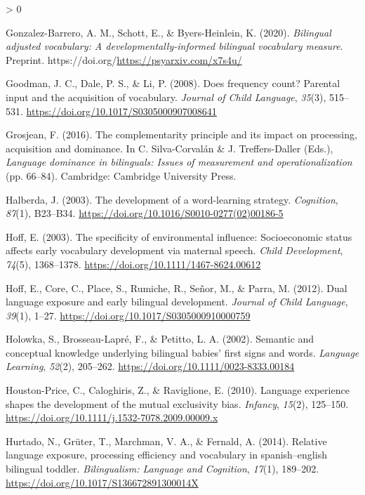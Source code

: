 \documentclass[
  english,
  ,man,floatsintext]{apa6}
\newlength{\cslhangindent}
\newenvironment{CSLReferences}[2] %
 {%
  \setlength{\parindent}{0pt}
  \ifodd #1 \everypar{\setlength{\hangindent}{\cslhangindent}}\ignorespaces\fi
  \ifnum #2 > 0
  \setlength{\parskip}{#2\baselineskip}
  \fi
 }%
 {}
\begin{document}
\begin{CSLReferences}{1}{0}
\leavevmode\hypertarget{ref-Gonzalez-Barrero_2020}{}%
Gonzalez-Barrero, A. M., Schott, E., \& Byers-Heinlein, K. (2020). \emph{Bilingual adjusted vocabulary: A developmentally-informed bilingual vocabulary measure}. Preprint. https://doi.org/\url{https://psyarxiv.com/x7s4u/}

\leavevmode\hypertarget{ref-Goodman_etal_2008}{}%
Goodman, J. C., Dale, P. S., \& Li, P. (2008). Does frequency count? Parental input and the acquisition of vocabulary. \emph{Journal of Child Language}, \emph{35}(3), 515--531. \url{https://doi.org/10.1017/S0305000907008641}

\leavevmode\hypertarget{ref-Grosjean_2016}{}%
Grosjean, F. (2016). The complementarity principle and its impact on processing, acquisition and dominance. In C. Silva-Corvalán \& J. Treffers-Daller (Eds.), \emph{Language dominance in bilinguals: Issues of measurement and operationalization} (pp. 66--84). Cambridge: Cambridge University Press.

\leavevmode\hypertarget{ref-Halberda_2003}{}%
Halberda, J. (2003). The development of a word-learning strategy. \emph{Cognition}, \emph{87}(1), B23--B34. \url{https://doi.org/10.1016/S0010-0277(02)00186-5}

\leavevmode\hypertarget{ref-Hoff_2003}{}%
Hoff, E. (2003). The specificity of environmental influence: Socioeconomic status affects early vocabulary development via maternal speech. \emph{Child Development}, \emph{74}(5), 1368--1378. \url{https://doi.org/10.1111/1467-8624.00612}

\leavevmode\hypertarget{ref-Hoff_etal_2012}{}%
Hoff, E., Core, C., Place, S., Rumiche, R., Señor, M., \& Parra, M. (2012). Dual language exposure and early bilingual development. \emph{Journal of Child Language}, \emph{39}(1), 1--27. \url{https://doi.org/10.1017/S0305000910000759}

\leavevmode\hypertarget{ref-Holowka_etal_2002}{}%
Holowka, S., Brosseau-Lapré, F., \& Petitto, L. A. (2002). Semantic and conceptual knowledge underlying bilingual babies' first signs and words. \emph{Language Learning}, \emph{52}(2), 205--262. \url{https://doi.org/10.1111/0023-8333.00184}

\leavevmode\hypertarget{ref-Houston-Price_etal_2010}{}%
Houston-Price, C., Caloghiris, Z., \& Raviglione, E. (2010). Language experience shapes the development of the mutual exclusivity bias. \emph{Infancy}, \emph{15}(2), 125--150. \url{https://doi.org/10.1111/j.1532-7078.2009.00009.x}

\leavevmode\hypertarget{ref-Hurtado_etal_2014}{}%
Hurtado, N., Grüter, T., Marchman, V. A., \& Fernald, A. (2014). Relative language exposure, processing efficiency and vocabulary in spanish--english bilingual toddler. \emph{Bilingualism: Language and Cognition}, \emph{17}(1), 189--202. \url{https://doi.org/10.1017/S136672891300014X}


\end{CSLReferences}
\end{document}

